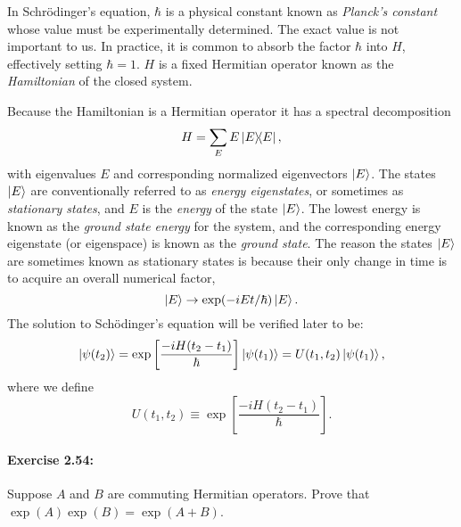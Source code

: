 In Schr{\"o}dinger's equation, $\hbar$ is a physical constant known
as \emph{Planck's constant} whose value must be experimentally determined. The
exact value is not important to us. In practice, it is common to absorb the
factor $\hbar$ into $H$, effectively setting $\hbar = 1$. $H$ is a fixed
Hermitian operator known as the \emph{Hamiltonian} of the closed system.

Because the Hamiltonian is a Hermitian operator it has a spectral decomposition
\begin{equation}
  H = \sum_E E\ketbra{E}{E}, \label{eq:ham-spec-dec}
\end{equation} with eigenvalues $E$ and corresponding normalized eigenvectors
$\ket{E}$. The states $\ket{E}$ are conventionally referred to as \emph{energy
eigenstates}, or sometimes as \emph{stationary states}, and $E$ is the
\emph{energy} of the state $\ket{E}$. The lowest energy is known as the
\emph{ground state energy} for the system, and the corresponding energy
eigenstate (or eigenspace) is known as the \emph{ground state}. The reason the
states $\ket{E}$ are sometimes known as stationary states is because their only
change in time is to acquire an overall numerical factor, \begin{equation*}
  \ket{E} \rightarrow \exp(-iEt/\hbar)\ket{E}.
\end{equation*}
The solution to Sch{\"o}dinger's equation will be verified later to be:
\begin{equation*} \ket{\psi(t_2)} = \exp\left[\frac{-iH(t_2 - t_1)}{\hbar}\right]
    \ket{\psi(t_1)} = U(t_1, t_2)\ket{\psi(t_1)},
\end{equation*} where we define \begin{equation}
  U(t_1, t_2) \equiv \exp\left[\frac{-iH(t_2 - t_1)}{\hbar}\right].
    \label{eq:unit-sch-eq}
\end{equation}

\paragraph{\cite{mikeandike} Exercise 2.54:} Suppose $A$ and $B$ are commuting
Hermitian operators. Prove that $\exp(A)\exp(B) = \exp(A + B)$.

